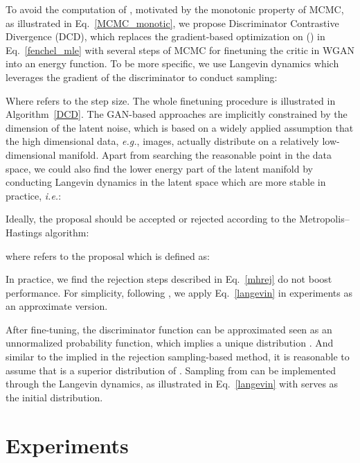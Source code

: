 \documentclass{article}
\begin{document}
To avoid the computation of , motivated by the monotonic property of MCMC, as illustrated in Eq.~\ref{MCMC_monotic}, we propose Discriminator Contrastive Divergence (DCD), which replaces the gradient-based optimization on () in Eq.~\ref{fenchel_mle} with several steps of MCMC for finetuning the critic in WGAN into an energy function. To be more specific, we use Langevin dynamics\cite{teh2003energy} which leverages the gradient of the discriminator to conduct sampling:

Where  refers to the step size. The whole finetuning procedure is illustrated in Algorithm~\ref{DCD}. 
The GAN-based approaches are implicitly constrained by the  dimension of the latent noise, which is based on a widely applied assumption that the high dimensional data, \emph{e.g.}, images, actually distribute on a relatively low-dimensional manifold. Apart from searching the reasonable point in the data space, we could also find the lower energy part of the latent manifold by conducting Langevin dynamics in the latent space which are more stable in practice, \emph{i.e.}:


Ideally, the proposal should be accepted or rejected according to the Metropolis–Hastings algorithm:

where  refers to the proposal which is defined as:

In practice, we find the rejection steps described in Eq.~\ref{mhrej} do not boost performance. For simplicity, following \cite{song2019generative,du2019implicit}, we apply Eq.~\ref{langevin} in experiments as an approximate version. 

After fine-tuning, the discriminator function can be approximated seen as an unnormalized probability function, which implies a unique distribution . And similar to the  implied in the rejection sampling-based method, it is reasonable to assume that  is a superior distribution of . Sampling from  can be implemented through the Langevin dynamics, as illustrated in Eq.~\ref{langevin} with  serves as the initial distribution.  


\section{Experiments}
\end{document}
